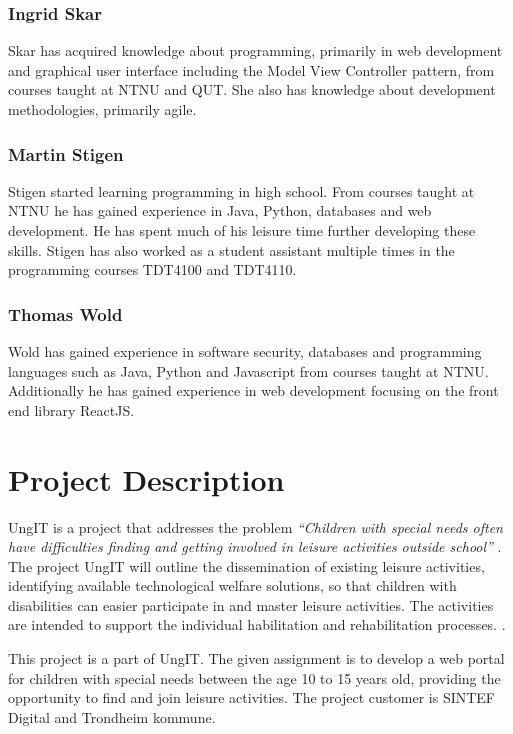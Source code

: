 \subsubsection{Ingrid Skar}
Skar has acquired knowledge about programming, primarily in web development and graphical user interface including the Model View Controller pattern, from courses taught at NTNU and QUT. She also has knowledge about development methodologies, primarily agile. 

\subsubsection{Martin Stigen}
Stigen started learning programming in high school. From courses taught at NTNU he has gained experience in Java, Python, databases and web development. He has spent much of his leisure time further developing these skills. Stigen has also worked as a student assistant multiple times in the programming courses TDT4100 and TDT4110.

\subsubsection{Thomas Wold}
Wold has gained experience in software security, databases and programming languages such as Java, Python and Javascript from courses taught at NTNU. Additionally he has gained experience in web development focusing on the front end library ReactJS. 

\section{Project Description}
\label{project_description}
UngIT is a project that addresses the problem \textit{“Children with special needs often have difficulties finding and getting involved in leisure activities outside school”} \cite{SintefBachelorProjectDescription}. The project UngIT will outline the dissemination of existing leisure activities, identifying available technological welfare solutions, so that children with disabilities can easier participate in and master leisure activities. The activities are intended to support the individual habilitation and rehabilitation processes. \cite{SintefOnlineProjectDescription}.

This project is a part of UngIT. The given assignment is to develop a web portal for children with special needs between the age 10 to 15 years old, providing the opportunity to find and join leisure activities. The project customer is SINTEF Digital and Trondheim kommune. 

